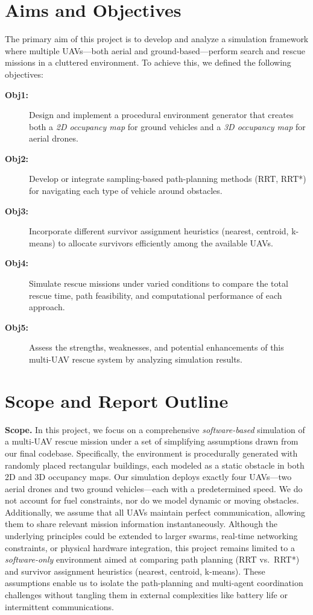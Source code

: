 \documentclass[12pt,a4paper]{report}
\begin{document}
\section{Aims and Objectives}
\label{sec:aims}
The primary aim of this project is to develop and analyze a simulation framework
where multiple UAVs—both aerial and ground-based—perform search and rescue missions
in a cluttered environment. To achieve this, we defined the following objectives:

\begin{description}
\item[\textbf{Obj1: }] Design and implement a procedural environment generator that creates 
          both a \emph{2D occupancy map} for ground vehicles and a \emph{3D occupancy map} 
          for aerial drones.

\item[\textbf{Obj2: }] Develop or integrate sampling-based path-planning methods 
          (RRT, RRT*) for navigating each type of vehicle around obstacles.

\item[\textbf{Obj3: }] Incorporate different survivor assignment heuristics 
          (nearest, centroid, k-means) to allocate survivors efficiently among the available UAVs.

\item[\textbf{Obj4: }] Simulate rescue missions under varied conditions to compare 
          the total rescue time, path feasibility, and computational performance 
          of each approach.

\item[\textbf{Obj5: }] Assess the strengths, weaknesses, and potential enhancements 
          of this multi-UAV rescue system by analyzing simulation results.
\end{description}

\section{Scope and Report Outline}
\label{sec:scope}
\textbf{Scope.} In this project, we focus on a comprehensive \emph{software-based}
simulation of a multi-UAV rescue mission under a set of simplifying assumptions drawn
from our final codebase. Specifically, the environment is procedurally generated with
randomly placed rectangular buildings, each modeled as a static obstacle in both
2D and 3D occupancy maps. Our simulation deploys exactly four UAVs—two aerial drones
and two ground vehicles—each with a predetermined speed. We do not account for
fuel constraints, nor do we model dynamic or moving obstacles. Additionally, we assume
that all UAVs maintain perfect communication, allowing them to share relevant mission
information instantaneously. Although the underlying principles could be extended to
larger swarms, real-time networking constraints, or physical hardware integration, this
project remains limited to a \emph{software-only} environment aimed at comparing path
planning (RRT vs.\ RRT*) and survivor assignment heuristics (nearest, centroid, k-means).
These assumptions enable us to isolate the path-planning and multi-agent coordination
challenges without tangling them in external complexities like battery life or
intermittent communications.
\end{document}
